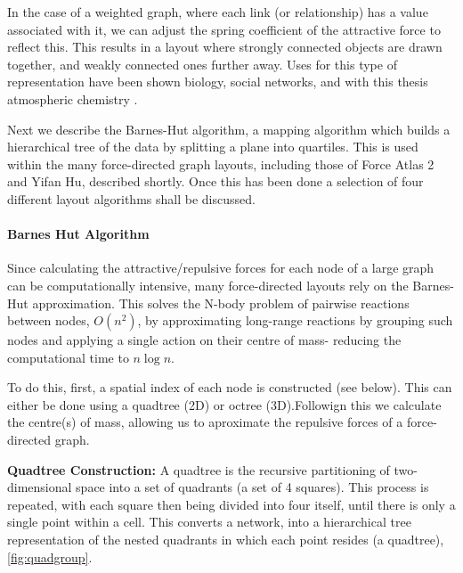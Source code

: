 In the case of a weighted graph, where each link (or relationship) has a value associated with it, we can adjust the spring coefficient of the attractive force to reflect this. This results in a layout where strongly connected objects are drawn together, and weakly connected ones further away. Uses for this type of representation have been shown biology, social networks, and with this thesis atmospheric chemistry \citep{ch3,ch4}.

Next we describe the Barnes-Hut algorithm, a mapping algorithm which builds a hierarchical tree of the data by splitting a plane into quartiles. This is used within the many force-directed graph layouts, including those of Force Atlas 2 and Yifan Hu, described shortly. Once this has been done a selection of four different layout algorithms shall be discussed.  


\paragraph*{Barnes Hut Algorithm}
Since calculating the attractive/repulsive forces for each node of a large graph can be computationally intensive, many force-directed layouts rely on the Barnes-Hut approximation. This solves the N-body problem of pairwise reactions between nodes, $O(n^2)$, by approximating long-range reactions by grouping such nodes and applying a single action on their centre of mass- reducing the computational time to $n \log n$.  

To do this, first, a spatial index of each node is constructed (see below). This can either be done using a quadtree (2D) or octree (3D).Followign this we calculate the centre(s) of mass, allowing us to aproximate the repulsive forces of a force-directed graph.

\textbf{Quadtree Construction:}
A quadtree is the recursive partitioning of two-dimensional space into a set of quadrants (a set of 4 squares). This process is repeated, with each square then being divided into four itself, until there is only a single point within a cell. This converts a network, into a hierarchical tree representation of the nested quadrants in which each point resides (a quadtree), \autoref{fig:quadgroup}. 


